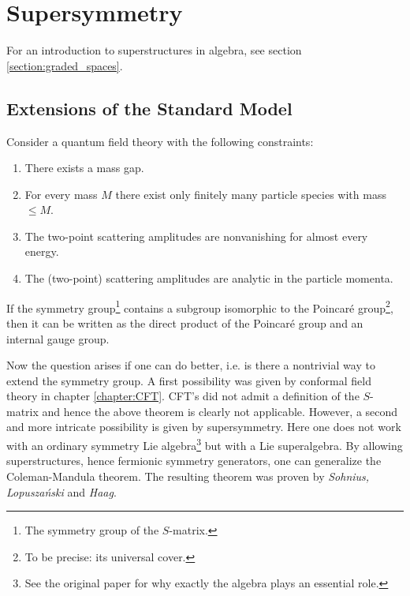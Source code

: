 \chapter{Supersymmetry}

    For an introduction to superstructures in algebra, see section \ref{section:graded_spaces}.

\section{Extensions of the Standard Model}

    \begin{theorem}
        Consider a quantum field theory with the following constraints:
        \begin{enumerate}
            \item There exists a mass gap.
            \item For every mass $M$ there exist only finitely many particle species with mass $\leq M$.
            \item The two-point scattering amplitudes are nonvanishing for almost every energy.
            \item The (two-point) scattering amplitudes are analytic in the particle momenta.
        \end{enumerate}
        If the symmetry group\footnote{The symmetry group of the $S$-matrix.} contains a subgroup isomorphic to the Poincar\'e group\footnote{To be precise: its universal cover.}, then it can be written as the direct product of the Poincar\'e group and an internal gauge group.
    \end{theorem}

    Now the question arises if one can do better, i.e. is there a nontrivial way to extend the symmetry group. A first possibility was given by conformal field theory in chapter \ref{chapter:CFT}. CFT's did not admit a definition of the $S$-matrix and hence the above theorem is clearly not applicable. However, a second and more intricate possibility is given by supersymmetry. Here one does not work with an ordinary symmetry Lie algebra\footnote{See the original paper \cite{coleman_mandula} for why exactly the algebra plays an essential role.} but with a Lie superalgebra. By allowing superstructures, hence fermionic symmetry generators, one can generalize the Coleman-Mandula theorem. The resulting theorem was proven by \textit{Sohnius, Lopusza\'nski} and \textit{Haag}.